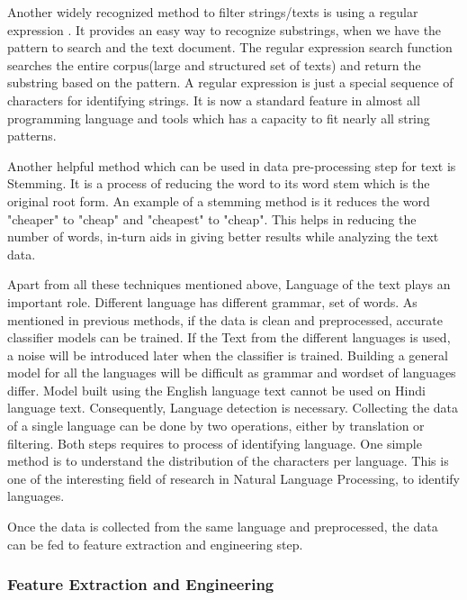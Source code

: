 Another widely recognized method to filter strings/texts is using a regular expression \cite{Thompson}. It provides an easy way to recognize substrings, when we have the pattern to search and the text document. The regular expression search function searches the entire corpus(large and structured set of texts) and return the substring based on the pattern. A regular expression is just a special sequence of characters for identifying strings. It is now a standard feature in almost all programming language and tools which has a capacity to fit nearly all string patterns.   

Another helpful method which can be used in data pre-processing step for text is Stemming. It is a process of reducing the word to its word stem which is the original root form. An example of a stemming method is it reduces the word "cheaper" to "cheap" and "cheapest" to "cheap". This helps in reducing the number of words, in-turn aids in giving better results while analyzing the text data.

Apart from all these techniques mentioned above, Language of the text plays an important role. Different language has different grammar, set of words. As mentioned in previous methods, if the data is clean and preprocessed, accurate classifier models can be trained. If the Text from the different languages is used, a noise will be introduced later when the classifier is trained. Building a general model for all the languages will be difficult as grammar and wordset of languages differ. Model built using the English language text cannot be used on Hindi language text. Consequently, Language detection is necessary. Collecting the data of a single language can be done by two operations, either by translation or filtering. Both steps requires to process of identifying language. One simple method is to understand the distribution of the characters per language. This is one of the interesting field of research in Natural Language Processing, to identify languages. 

Once the data is collected from the same language and preprocessed, the data can be fed to feature extraction and engineering step.

\subsubsection{Feature Extraction and Engineering} \label{backgroundworkFeatureEngi}

